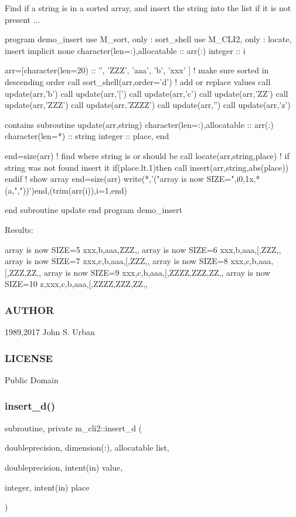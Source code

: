 Find if a string is in a sorted array, and insert the string into the list if it is not present ... \begin{DoxyVerb}program demo_insert
use M_sort, only : sort_shell
use M_CLI2, only : locate, insert
implicit none
character(len=:),allocatable :: arr(:)
integer                       :: i

arr=[character(len=20) :: '', 'ZZZ', 'aaa', 'b', 'xxx' ]
! make sure sorted in descending order
call sort_shell(arr,order='d')
! add or replace values
call update(arr,'b')
call update(arr,'[')
call update(arr,'c')
call update(arr,'ZZ')
call update(arr,'ZZZ')
call update(arr,'ZZZZ')
call update(arr,'')
call update(arr,'z')

contains
subroutine update(arr,string)
character(len=:),allocatable :: arr(:)
character(len=*)             :: string
integer                      :: place, end

end=size(arr)
! find where string is or should be
call locate(arr,string,place)
! if string was not found insert it
if(place.lt.1)then
   call insert(arr,string,abs(place))
endif
! show array
end=size(arr)
write(*,'("array is now SIZE=",i0,1x,*(a,","))')end,(trim(arr(i)),i=1,end)

end subroutine update
end program demo_insert
\end{DoxyVerb}


Results\+:

array is now S\+I\+ZE=5 xxx,b,aaa,Z\+ZZ,, array is now S\+I\+ZE=6 xxx,b,aaa,\mbox{[},Z\+ZZ,, array is now S\+I\+ZE=7 xxx,c,b,aaa,\mbox{[},Z\+ZZ,, array is now S\+I\+ZE=8 xxx,c,b,aaa,\mbox{[},Z\+ZZ,ZZ,, array is now S\+I\+ZE=9 xxx,c,b,aaa,\mbox{[},Z\+Z\+ZZ,Z\+ZZ,ZZ,, array is now S\+I\+ZE=10 z,xxx,c,b,aaa,\mbox{[},Z\+Z\+ZZ,Z\+ZZ,ZZ,,

\subsubsection*{A\+U\+T\+H\+OR}

1989,2017 John S. Urban \subsubsection*{L\+I\+C\+E\+N\+SE}

Public Domain \mbox{\label{namespacem__cli2_a737ae8e6f73a3fc8cc260732c047fafb}} 
\subsubsection{\texorpdfstring{insert\+\_\+d()}{insert\_d()}}
{\footnotesize\ttfamily subroutine, private m\+\_\+cli2\+::insert\+\_\+d (\begin{DoxyParamCaption}\item[{doubleprecision, dimension(\+:), allocatable}]{list,  }\item[{doubleprecision, intent(in)}]{value,  }\item[{integer, intent(in)}]{place }\end{DoxyParamCaption})\hspace{0.3cm}{\ttfamily [private]}}

